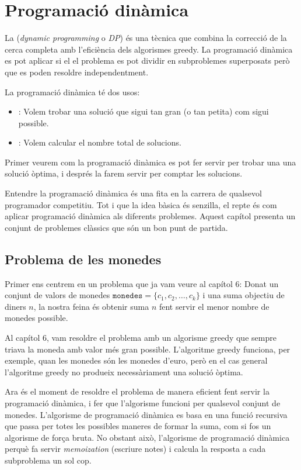 \chapter{Programació dinàmica}


La  (\emph{dynamic programming} o \emph{DP})
és una tècnica que combina la correcció
de la cerca completa amb l'eficiència
dels algorismes greedy.
La programació dinàmica es pot aplicar si el
el problema es pot dividir en subproblemes superposats
però que es poden resoldre independentment.

La programació dinàmica té dos usos:

\begin{itemize}
\item
{}:
Volem trobar una solució que sigui
tan gran (o tan petita) com sigui possible.
\item
{}:
Volem calcular el nombre total de
solucions.
\end{itemize}

Primer veurem com la programació dinàmica
es pot fer servir per trobar una una solució òptima,
i després la farem servir per
comptar les solucions.

Entendre la programació dinàmica és una fita
en la carrera de qualsevol programador competitiu.
Tot i que la idea bàsica és senzilla,
el repte és com aplicar
programació dinàmica als diferents problemes.
Aquest capítol presenta un conjunt de problemes clàssics
que són un bon punt de partida.

\section{Problema de les monedes}

Primer ens centrem en un problema que
ja vam veure al capítol 6:
Donat un conjunt de valors de monedes $\texttt{monedes} = \{c_1,c_2,\ldots,c_k\}$
i una suma objectiu de diners $n$, la nostra feina és
obtenir suma $n$ fent servir el menor nombre de monedes possible.

Al capítol 6, vam resoldre el problema amb un
algorisme greedy que sempre triava la moneda
amb valor més gran possible.
L'algoritme greedy funciona, per exemple,
quan les monedes són les monedes d'euro,
però en el cas general l'algoritme greedy
no produeix necessàriament una solució òptima.

Ara és el moment de resoldre el problema de manera eficient
fent servir la programació dinàmica, i fer que l'algorisme
funcioni per qualsevol conjunt de monedes.
L'algorisme de programació dinàmica
es basa en una funció recursiva
que passa per totes les possibles maneres de
formar la suma, com si fos un algorisme de força bruta.
No obstant això, l'algorisme de programació dinàmica
perquè fa servir \emph{memoization} (escriure notes) i
calcula la resposta a cada subproblema un sol cop.

